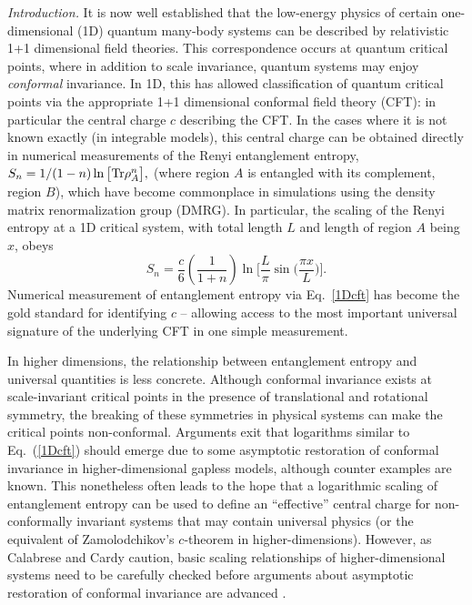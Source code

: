 \documentclass[prl,aps,twocolumn,floatfix,amsmath,amssymb,superscriptaddress,tightenlines]{revtex4}
\begin{document}
{\it Introduction.} It is now well established that the low-energy physics of certain one-dimensional (1D) quantum many-body systems can be described by relativistic 1+1 dimensional field theories.  This correspondence occurs at quantum critical points, where in addition to scale invariance, quantum systems may enjoy {\it conformal} invariance.  In 1D, this has allowed classification of quantum critical points via the appropriate 1+1 dimensional conformal field theory (CFT): in particular the central charge $c$ describing the CFT.
In the cases where it is not known exactly (in integrable models), 
this central charge can be obtained directly in numerical measurements of the Renyi entanglement entropy,
$
S_n = 1/(1-n) \ln \big[ {\rm Tr} \rho_A^n \big],
$
(where region $A$ is entangled with its complement, region $B$), which have become commonplace in simulations using the density matrix renormalization group (DMRG).  In particular, the
scaling of the Renyi entropy at a 1D critical system, with total length $L$ and length of region $A$ being $x$, obeys
\begin{equation}
S_n = \frac{c}{6}\left({ \frac{1}{1+n} }\right) \ln\Big[ \frac{L}{\pi} \sin\big( \frac{\pi x}{L} \big) \Big]. \label{1Dcft}
\end{equation}
Numerical measurement of entanglement entropy via Eq.~\ref{1Dcft} has become the gold standard for identifying $c$ --
allowing access to the most important universal signature of the underlying CFT in one simple measurement.

In higher dimensions, the relationship between entanglement entropy and universal quantities is less concrete.  Although conformal invariance exists at scale-invariant critical points in the presence of translational and rotational symmetry, the breaking of these symmetries in physical systems can make the critical points non-conformal.  Arguments exit that logarithms similar to Eq.~(\ref{1Dcft}) should emerge due to some asymptotic restoration of conformal invariance in higher-dimensional gapless models, although counter examples are known.  This nonetheless often leads to the hope that a logarithmic scaling of entanglement entropy can be used to define an ``effective'' central charge for non-conformally invariant systems that may contain universal physics (or the equivalent of Zamolodchikov's $c$-theorem in higher-dimensions).
However, as Calabrese and Cardy caution, basic scaling relationships of higher-dimensional systems need to be carefully checked before
arguments about asymptotic restoration of conformal invariance are advanced \cite{EE_CFT}.
\end{document}
